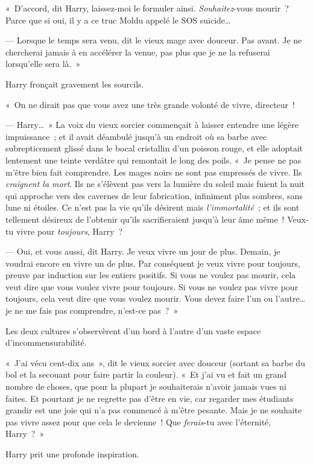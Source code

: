 «~D'accord, dit Harry, laissez-moi le formuler ainsi. \emph{Souhaitez}-vous mourir~? Parce que si oui, il y a ce truc Moldu appelé le SOS suicide…

--- Lorsque le temps sera venu, dit le vieux mage avec douceur. Pas avant. Je ne chercherai jamais à en accélérer la venue, pas plus que je ne la refuserai lorsqu'elle sera là.~»

Harry fronçait gravement les sourcils.

«~On ne dirait pas que vous avez une très grande volonté de vivre, directeur~!

--- Harry…~» La voix du vieux sorcier commençait à laisser entendre une légère impuissance~; et il avait déambulé jusqu'à un endroit où sa barbe avec subrepticement glissé dans le bocal cristallin d'un poisson rouge, et elle adoptait lentement une teinte verdâtre qui remontait le long des poils. «~Je pense ne pas m'être bien fait comprendre. Les mages noirs ne sont pas empressés de vivre. Ils \emph{craignent la mort}. Ils ne s'élèvent pas vers la lumière du soleil mais fuient la nuit qui approche vers des cavernes de leur fabrication, infiniment plus sombres, sans lune ni étoiles. Ce n'est pas la vie qu'ils désirent mais \emph{l'immortalité}~; et ils sont tellement désireux de l'obtenir qu'ils sacrifieraient jusqu'à leur âme même~! Veux-tu vivre pour \emph{toujours}, Harry~?

--- Oui, et vous aussi, dit Harry. Je veux vivre un jour de plus. Demain, je voudrai encore en vivre un de plus. Par conséquent je veux vivre pour toujours, preuve par induction sur les entiers positifs. Si vous ne voulez pas mourir, cela veut dire que vous voulez vivre pour toujours. Si vous ne voulez pas vivre pour toujours, cela veut dire que vous voulez mourir. Vous devez faire l'un ou l'autre… je ne me fais pas comprendre, n'est-ce pas~?~»

Les deux cultures s'observèrent d'un bord à l'autre d'un vaste espace d'incommensurabilité.

«~J'ai vécu cent-dix ans~», dit le vieux sorcier avec douceur (sortant sa barbe du bol et la secouant pour faire partir la couleur). «~Et j'ai vu et fait un grand nombre de choses, que pour la plupart je souhaiterais n'avoir jamais vues ni faites. Et pourtant je ne regrette pas d'être en vie, car regarder mes étudiants grandir est une joie qui n'a pas commencé à m'être pesante. Mais je ne souhaite pas vivre assez pour que cela le devienne~! Que \emph{ferais}-tu avec l'éternité, Harry~?~»

Harry prit une profonde inspiration.

